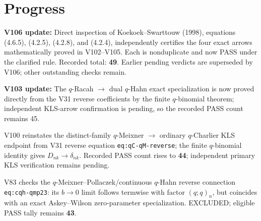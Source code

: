 \documentclass[11pt]{article}
\begin{document}
\section{Progress}
\noindent\textbf{V106 update:} Direct inspection of Koekoek--Swarttouw (1998), equations (4.6.5), (4.2.5), (4.2.8), and (4.2.4), independently certifies the four exact arrows mathematically proved in V102--V105. Each is nonduplicate and now PASS under the clarified rule. Recorded total: \textbf{49}. Earlier pending verdicts are superseded by V106; other outstanding checks remain.\par

\noindent\textbf{V103 update:} The $q$-Racah $\to$ dual $q$-Hahn exact specialization is now proved directly from the V31 reverse coefficients by the finite $q$-binomial theorem; independent KLS-arrow confirmation is pending, so the recorded PASS count remains 45.\par

\noindent V100 reinstates the distinct-family $q$-Meixner $\to$ ordinary $q$-Charlier KLS endpoint from V31 reverse equation \texttt{eq:qC-qM-reverse}; the finite $q$-binomial identity gives $D_{nk}\to\delta_{nk}$. Recorded PASS count rises to \textbf{44}; independent primary KLS verification remains pending.\par

\noindent V83 checks the $q$-Meixner--Pollaczek/continuous $q$-Hahn reverse connection \texttt{eq:cqh-qmp23}: its $b\to0$ limit follows termwise with factor $(q;q)_n$, but coincides with an exact Askey--Wilson zero-parameter specialization. EXCLUDED; eligible PASS tally remains \textbf{43}.\par
\end{document}
